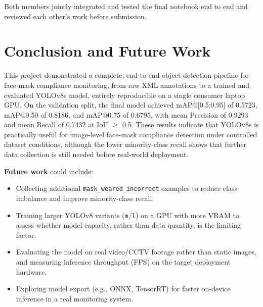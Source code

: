 \documentclass[12pt]{article}
\begin{document}
Both members jointly integrated and tested the final notebook end to end
and reviewed each other's work before submission.

\section{Conclusion and Future Work}

This project demonstrated a complete, end-to-end object-detection pipeline
for face-mask compliance monitoring, from raw XML annotations to a trained
and evaluated YOLOv8s model, entirely reproducible on a single consumer
laptop GPU. On the validation split, the final model achieved mAP@[0.5:0.95]
of 0.5723, mAP@0.50 of 0.8186, and mAP@0.75 of 0.6795, with mean Precision of
0.9293 and mean Recall of 0.7432 at IoU $\geq$ 0.5. These results indicate
that YOLOv8s is practically useful for image-level face-mask compliance
detection under controlled dataset conditions, although the lower
minority-class recall shows that further data collection is still needed
before real-world deployment.

\textbf{Future work} could include:
\begin{itemize}[noitemsep]
    \item Collecting additional \texttt{mask\_weared\_incorrect} examples
          to reduce class imbalance and improve minority-class recall.
    \item Training larger YOLOv8 variants (\texttt{m}/\texttt{l}) on a
          GPU with more VRAM to assess whether model capacity, rather
          than data quantity, is the limiting factor.
    \item Evaluating the model on real video/CCTV footage rather than
          static images, and measuring inference throughput (FPS) on the
          target deployment hardware.
    \item Exploring model export (e.g., ONNX, TensorRT) for faster
          on-device inference in a real monitoring system.
\end{itemize}
\end{document}
